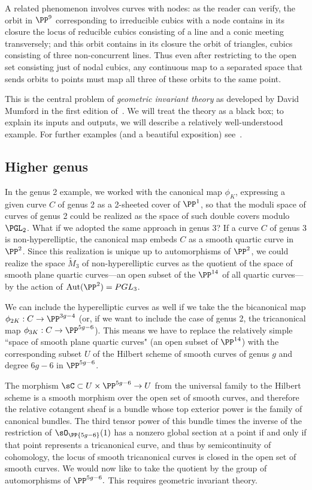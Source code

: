 A related phenomenon involves curves with nodes: as the reader can verify, the orbit in $\PP^9$ corresponding to irreducible cubics with a node contains in its closure the locus of reducible cubics consisting of a line and a conic meeting transversely; and this orbit contains in its closure the orbit of triangles, cubics consisting of three non-concurrent lines. Thus even after restricting to the open set consisting just of nodal cubics, any continuous map 
to a separated space that sends orbits to points must map all three of these orbits  to the same point.

This is the central problem of \emph{geometric invariant theory} as developed by David Mumford in the first edition of~\cite{GIT}. We will treat the theory as a black box; to explain its inputs and outputs, we will describe a relatively well-understood example. For further examples (and a beautiful exposition) see~\cite{IntroModuli}.

\subsection{Higher genus}

In the genus 2 example, we worked with the canonical map $\phi_K$, expressing a given curve $C$ of genus 2 as a 2-sheeted cover of $\PP^1$, so that the moduli space of curves of genus 2 could be realized as the space of such double covers modulo $\PGL_2$. What if we adopted the same approach in genus 3? If a curve $C$ of genus 3 is non-hyperelliptic, the canonical map embeds $C$ as a smooth quartic curve in $\PP^2$. Since this realization is unique up to automorphisms of $\PP^2$, we could realize the space $\tilde M_3$ of non-hyperelliptic curves as the quotient of the space of smooth plane quartic curves---an open subset of the $\PP^{14}$ of all quartic curves---by the action of ${\rm Aut}(\PP^2) = PGL_3$. 

We can include the hyperelliptic curves as well if we take the the bicanonical map $\phi_{2K} : C \to \PP^{3g-4}$ (or, if we want to include the case of genus 2, the tricanonical map  $\phi_{3K} : C \to \PP^{5g-6}$). This means we have to replace the relatively simple ``space of smooth plane quartic curves" (an open subset of $\PP^{14}$) with the corresponding subset $U$ of the Hilbert scheme of smooth curves of genus $g$ and degree $6g-6$ in $\PP^{5g-6}$. 

The morphism $\sC \subset U \times \PP^{5g-6} \to U$ from the universal family to the Hilbert scheme is a smooth morphism over the open set of smooth curves, and therefore the relative cotangent sheaf is a bundle whose top exterior power is the family of canonical bundles. 
The third tensor power  of this bundle times the inverse of the restriction of $\sO_\PP{5g-6}(1)$ has a nonzero global section at a point if and only if
that point represents a tricanonical curve, and thus by semicontinuity of cohomology, the locus of smooth tricanonical curves is closed
in the open set of smooth curves. We would now like to take the quotient by the group of automorphisms
of $\PP^{5g-6}.$ This requires geometric invariant theory.



